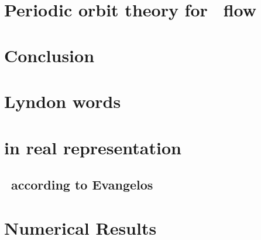 \chapter{\KS\ \statesp}

\chapter{Periodic orbit theory for \KS\ flow}

\chapter{Conclusion}


\appendix

\chapter{Lyndon words}


\chapter{\KSe in real representation}

\section{\KSe\ according to Evangelos}


\chapter{Numerical Results}


\begin{postliminary}
\gtindex
    \ifpaper               %
\begin{vita}
    
\end{vita}
    \fi
\end{postliminary}


